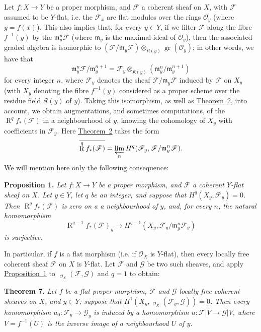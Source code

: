 \documentclass{article}
\newenvironment{itenv}[1]
  {\phantomsection\par\medskip\noindent\textbf{#1.}\itshape}
  {\par\medskip}
\newcommand{\scr}[1]{{\mathscr{#1}}}
\newcommand{\fk}{\mathfrak}
\newcommand{\kres}{\mathfrak{K}}
\DeclareMathOperator{\RR}{R}
\DeclareMathOperator{\Hom}{Hom}
\DeclareMathOperator{\shHom}{\underline{\Hom}}
\DeclareMathOperator{\gr}{gr}
\newcommand{\oldpage}[1]{\marginpar{\footnotesize$\Big\vert$ \textit{p.~#1}}}
\begin{document}
Let $f\colon X\to Y$ be a proper morphism, and $\scr{F}$ a coherent sheaf on $X$,
\oldpage{182-09}
with $\scr{F}$ assumed to be $Y$-flat, i.e. the $\scr{F}_x$ are flat modules over the rings $\scr{O}_y$ (where $y=f(x)$).
This also implies that, for every $y\in Y$, if we filter $\scr{F}$ along the fibre $f^{-1}(y)$ by the $\fk{m}_y^n\scr{F}$ (where $\fk{m}_y$ is the maximal ideal of $\scr{O}_y$), then the associated graded algebra is isomorphic to $(\scr{F}/\fk{m}_y\scr{F})\otimes_{\kres(y)}\gr(\scr{O}_y)$;
in other words, we have that
\[
  \fk{m}_y^n\scr{F}/\fk{m}_y^{n+1}
  = \scr{F}_y\otimes_{\kres(y)}(\fk{m}_y^n/\fk{m}_y^{n+1})
\]
for every integer $n$, where $\scr{F}_y$ denotes the sheaf $\scr{F}/\fk{m}_y\scr{F}$ induced by $\scr{F}$ on $X_y$ (with $X_y$ denoting the fibre $f^{-1}(y)$ considered as a proper scheme over the residue field $\kres(y)$ of $y$).
Taking this isomorphism, as well as \hyperref[theorem2]{Theorem~2}, into account, we obtain augmentations, and sometimes computations, of the $\RR^q f_*(\scr{F})$ in a neighbourhood of $y$, knowing the cohomology of $X_y$ with coefficients in $\scr{F}_y$.
Here \hyperref[theorem2]{Theorem~2} takes the form
\[
  \overline{\RR^q f_*(\scr{F})} = \varprojlim_n H^q(\scr{F}_y,\scr{F}/\fk{m}_y^n\scr{F}).
\]
We will mention here only the following consequence:

\begin{itenv}{Proposition 1}
\label{proposition1}
  Let $f\colon X\to Y$ be a proper morphism, and $\scr{F}$ a coherent $Y$-flat sheaf on $X$.
  Let $y\in Y$, let $q$ be an integer, and suppose that $H^q(X_y,\scr{F}_y)=0$.
  Then $\RR^q f_*(\scr{F})$ is zero on a a neighbourhood of $y$, and, for every $n$, the natural homomorphism
  \[
    \RR^{q-1}f_*(\scr{F})_y \to H^{q-1}(X_y,\scr{F}_y/\fk{m}_y^n\scr{F}_y)
  \]
  is surjective.
\end{itenv}

In particular, if $f$ is a flat morphism (i.e. if $\scr{O}_X$ is $Y$-flat), then every locally free coherent sheaf $\scr{F}$ on $X$ is $Y$-flat.
Let $\scr{F}$ and $\scr{G}$ be two such sheaves, and apply \hyperref[proposition1]{Proposition~1} to $\shHom_{\scr{O}_X}(\scr{F},\scr{G})$ and $q=1$ to obtain:

\begin{itenv}{Theorem 7}
\label{theorem7}
  Let $f$ be a flat proper morphism, $\scr{F}$ and $\scr{G}$ locally free coherent sheaves on $X$, and $y\in Y$;
  suppose that $H^1(X_y,\shHom_{\scr{O}_X}(\scr{F}_y,\scr{G}))=0$.
  Then every homomorphism $u_0\colon\scr{F}_y\to\scr{G}_y$ is induced by a homomorphism $u\colon\scr{F}|V\to\scr{G}|V$, where $V=f^{-1}(U)$ is the inverse image of a neighbourhood $U$ of $y$.
\end{itenv}
\end{document}

